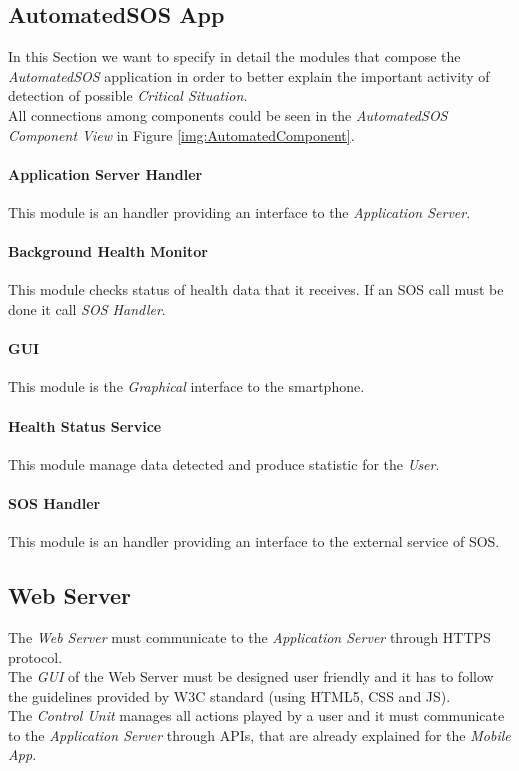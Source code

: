 \subsection{AutomatedSOS App}
In this Section we want to specify in detail the modules that compose the \textit{AutomatedSOS} application in order to better explain the important activity of detection of possible \textit{Critical Situation}.\\
All connections among components could be seen in the \textit{AutomatedSOS Component View} in Figure \ref{img:AutomatedComponent}.

\paragraph{Application Server Handler}
This module is an handler providing an interface to the \textit{Application Server}.

\paragraph{Background Health Monitor}
This module checks status of health data that it receives. If an SOS call must be done it call \textit{SOS Handler}.

\paragraph{GUI}
This module is the \textit{Graphical} interface to the smartphone.

\paragraph{Health Status Service}
This module manage data detected and produce statistic for the \textit{User}.

\paragraph{SOS Handler}
This module is an handler providing an interface to the external service of SOS.

\subsection{Web Server}
The \textit{Web Server} must communicate to the \textit{Application Server} through HTTPS protocol.\\
The \textit{GUI} of the \textit{}{Web Server} must be designed user friendly and it has to follow the guidelines provided by W3C standard (using HTML5, CSS and JS).\\
The \textit{Control Unit} manages all actions played by a user and it must communicate to the \textit{Application Server} through APIs, that are already explained for the \textit{Mobile App}.

